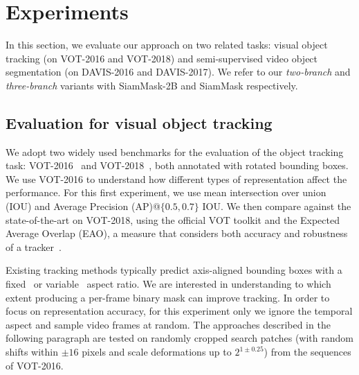 \section{Experiments}
\label{sec:experiments}
In this section, we evaluate our approach on two related tasks: visual object tracking (on VOT-2016 and VOT-2018) and semi-supervised video object segmentation (on DAVIS-2016 and DAVIS-2017).
We refer to our \emph{two-branch} and \emph{three-branch} variants with SiamMask-2B and SiamMask respectively.

\subsection{Evaluation for visual object tracking}
\label{sec:exp_track}

We adopt two widely used benchmarks for the evaluation of the object tracking task: VOT-2016~\cite{kristan2016visual} and VOT-2018~\cite{VOT2018}, both annotated with rotated bounding boxes.
We use VOT-2016 to understand how different types of representation affect the performance.
For this first experiment, we use mean intersection over union (IOU) and Average Precision (AP)@$\{0.5,0.7\}$ IOU.
We then compare against the state-of-the-art on VOT-2018, using the official VOT toolkit and the Expected Average Overlap (EAO), a measure that considers both accuracy and robustness of a tracker~\cite{VOT2018}.


Existing tracking methods typically predict axis-aligned bounding boxes with a fixed~\cite{bertinetto2016fully,henriques2015tracking,danelljan2015learning,lukezic2017discriminative} or variable~\cite{SiamRPN,held2016learning,zhu2018distractor} aspect ratio.
We are interested in understanding to which extent producing a per-frame binary mask can improve tracking.
In order to focus on representation accuracy, for this experiment only we ignore the temporal aspect and sample video frames at random.
The approaches described in the following paragraph are tested on randomly cropped search patches (with random shifts within $\pm16$ pixels and scale deformations up to $2^{1\pm0.25}$) from the sequences of VOT-2016.


